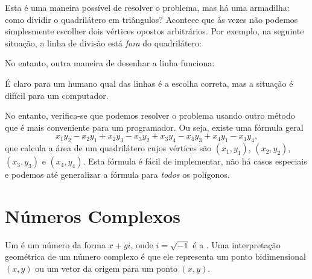 Esta é uma maneira possível de resolver o problema, mas há uma armadilha: como dividir o quadrilátero em triângulos? Acontece que às vezes não podemos simplesmente escolher dois vértices opostos arbitrários. Por exemplo, na seguinte situação, a linha de divisão está \emph{fora} do quadrilátero:
\begin{center}
\end{center}
No entanto, outra maneira de desenhar a linha funciona:
\begin{center}
\end{center}
É claro para um humano qual das linhas é a escolha correta, mas a situação é difícil para um computador.

No entanto, verifica-se que podemos resolver o problema usando outro método que é mais conveniente para um programador. Ou seja, existe uma fórmula geral
\[x_1y_2-x_2y_1+x_2y_3-x_3y_2+x_3y_4-x_4y_3+x_4y_1-x_1y_4,\]
que calcula a área de um quadrilátero cujos vértices são
$(x_1,y_1)$,
$(x_2,y_2)$,
$(x_3,y_3)$ e
$(x_4,y_4)$.
Esta fórmula é fácil de implementar, não há casos especiais e podemos até generalizar a fórmula para \emph{todos} os polígonos.

\section{Números Complexos}


Um  é um número da forma $x+y i$,
onde $i = \sqrt{-1}$ é a .
Uma interpretação geométrica de um número complexo é
que ele representa um ponto bidimensional $(x,y)$
ou um vetor da origem para um ponto $(x,y)$.

